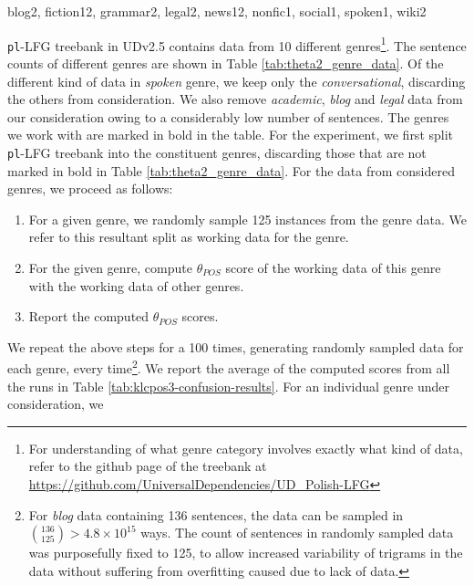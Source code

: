 





blog2, fiction12, grammar2, legal2, news12, nonfic1, social1, spoken1, wiki2

\verb|pl|-LFG treebank in UDv2.5 contains data from 10 different genres\footnote{For understanding of what genre category involves exactly what kind of data, refer to the github page of the treebank at \url{https://github.com/UniversalDependencies/UD_Polish-LFG}}. The sentence counts of different genres are shown in Table \ref{tab:theta2_genre_data}. Of the different kind of data in \textit{spoken} genre, we keep only the \textit{conversational}, discarding the others from consideration. We also remove \textit{academic}, \textit{blog} and \textit{legal} data from our consideration owing to a considerably low number of sentences. The genres we work with are marked in bold in the table. For the experiment, we first split \verb|pl|-LFG treebank into the constituent genres, discarding those that are not marked in bold in Table \ref{tab:theta2_genre_data}. For the data from considered genres, we proceed as follows:

\begin{enumerate}
    \item For a given genre, we randomly sample 125 instances from the genre data. We refer to this resultant split as working data for the genre.
    \item For the given genre, compute \(\theta_{POS}\) score of the working data of this genre with the working data of other genres.
    \item Report the computed \(\theta_{POS}\) scores.
\end{enumerate}

We repeat the above steps for a 100 times, generating randomly sampled data for each genre, every time\footnote{For \textit{blog} data containing 136 sentences, the data can be sampled in \(\genfrac(){0pt}{2}{136}{125} > 4.8 \times 10^{15}\) ways. The count of sentences in randomly sampled data was purposefully fixed to 125, to allow increased variability of trigrams in the data without suffering from overfitting caused due to lack of data.}. We report the average of the computed scores from all the runs in Table \ref{tab:klcpos3-confusion-results}. For an individual genre under consideration, we 

